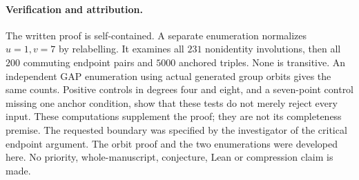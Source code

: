 \documentclass[11pt,a4paper]{article}
\begin{document}
\paragraph{Verification and attribution.}
The written proof is self-contained. A separate enumeration normalizes
$u=1,v=7$ by relabelling. It examines all $231$ nonidentity involutions,
then all $200$ commuting endpoint pairs and $5000$ anchored triples.
None is transitive. An independent GAP enumeration using actual generated
group orbits gives the same counts. Positive controls in degrees four
and eight, and a seven-point control missing one anchor condition, show
that these tests do not merely reject every input. These computations
supplement the proof; they are not its completeness premise.
The requested boundary was specified by the investigator of the critical
endpoint argument. The orbit proof and the two enumerations were developed
here. No priority, whole-manuscript, conjecture, Lean or compression claim
is made.
\end{document}
